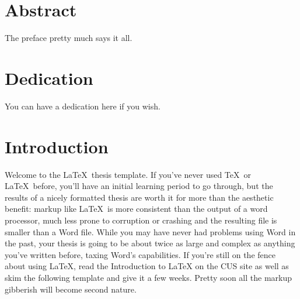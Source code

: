 \documentclass[
    12pt,
    twoside,
    bibstyle=ieee,
    headerstyle=uppercase
]{reedthesis}
\begin{document}
    \tableofcontents
    \listoftables
    \listoffigures

    \chapter*{Abstract}
	The preface pretty much says it all.
	
	\chapter*{Dedication}
	You can have a dedication here if you wish.

  \mainmatter %
  \pagestyle{fancyplain} %


    \chapter*{Introduction}

	
	Welcome to the \LaTeX\ thesis template. If you've never used \TeX\ or \LaTeX\ before, you'll have an initial learning period to go through, but the results of a nicely formatted thesis are worth it for more than the aesthetic benefit: markup like \LaTeX\ is more consistent than the output of a word processor, much less prone to corruption or crashing and the resulting file is smaller than a Word file. While you may have never had problems using Word in the past, your thesis is going to be about twice as large and complex as anything you've written before, taxing Word's capabilities. If you're still on the fence about  using \LaTeX, read the Introduction to LaTeX on the CUS site as well as skim the following template and give it a few weeks. Pretty soon all the markup gibberish will become second nature.
\end{document}
